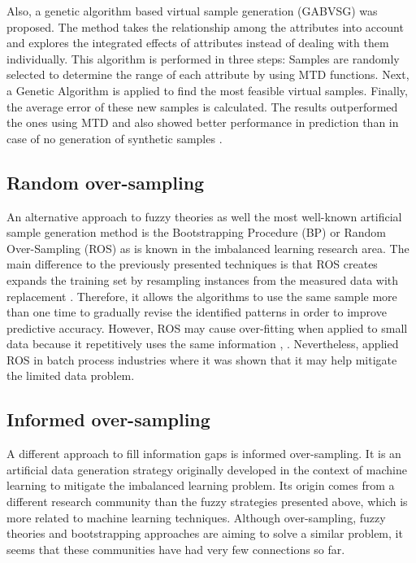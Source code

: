 \documentclass[parskip=full]{scrartcl}
\begin{document}
Also, a genetic algorithm based virtual sample generation (GABVSG) was proposed.
The method takes the relationship among the attributes into account and explores
the integrated effects of attributes instead of dealing with them individually.
This algorithm is performed in three steps: Samples are randomly selected to
determine the range of each attribute by using MTD functions. Next, a Genetic
Algorithm is applied to find the most feasible virtual samples. Finally, the
average error of these new samples is calculated. The results outperformed the
ones using MTD and also showed better performance in prediction than in case of
no generation of synthetic samples \cite{Li.2014}.

\subsection{Random over-sampling}

An alternative approach to fuzzy theories as well the most well-known artificial
sample generation method is the Bootstrapping Procedure (BP)
\cite{AbdulLateh.2017} or Random Over-Sampling (ROS) as is known in the
imbalanced learning research area. The main difference to the previously
presented techniques is that ROS creates expands the training set by resampling
instances from the measured data with replacement \cite{Efron.1993}. Therefore,
it allows the algorithms to use the same sample more than one time to gradually
revise the identified patterns in order to improve predictive accuracy. However,
ROS may cause over-fitting when applied to small data because it repetitively
uses the same information \cite{Tsai.2015}, \cite{Li.2018}. Nevertheless,
\cite{Ivanescu.2006} applied ROS in batch process industries where it was shown
that it may help mitigate the limited data problem.

\subsection{Informed over-sampling}

A different approach to fill information gaps is informed over-sampling. It is
an artificial data generation strategy originally developed in the context of
machine learning to mitigate the imbalanced learning problem. Its origin comes
from a different research community than the fuzzy strategies presented above,
which is more related to machine learning techniques. Although over-sampling,
fuzzy theories and bootstrapping approaches are aiming to solve a similar
problem, it seems that these communities have had very few connections so far.
\end{document}
